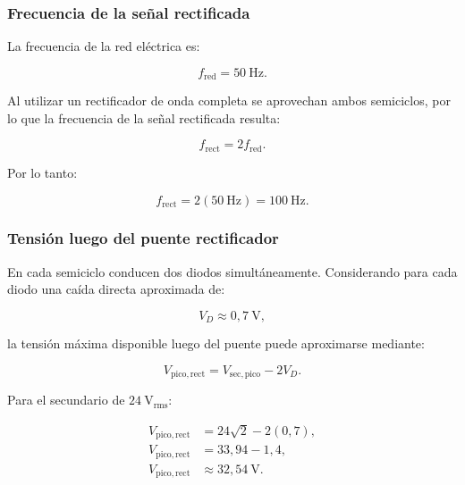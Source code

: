 \documentclass[12pt,a4paper]{article}
\begin{document}
	\subsubsection{Frecuencia de la señal rectificada}
	
	La frecuencia de la red eléctrica es:
	
	\begin{equation}
		f_{\mathrm{red}}
		=
		50~\text{Hz}.
	\end{equation}
	
	Al utilizar un rectificador de onda completa se aprovechan ambos semiciclos,
	por lo que la frecuencia de la señal rectificada resulta:
	
	\begin{equation}
		f_{\mathrm{rect}}
		=
		2f_{\mathrm{red}}.
	\end{equation}
	
	Por lo tanto:
	
	\begin{equation}
		f_{\mathrm{rect}}
		=
		2(50~\text{Hz})
		=
		100~\text{Hz}.
	\end{equation}
	
	\subsubsection{Tensión luego del puente rectificador}
	
	En cada semiciclo conducen dos diodos simultáneamente. Considerando para cada
	diodo una caída directa aproximada de:
	
	\begin{equation}
		V_D\approx0,7~\text{V},
	\end{equation}
	
	la tensión máxima disponible luego del puente puede aproximarse mediante:
	
	\begin{equation}
		V_{\mathrm{pico,rect}}
		=
		V_{\mathrm{sec,pico}}
		-
		2V_D.
	\end{equation}
	
	Para el secundario de $24~\text{V}_{\mathrm{rms}}$:
	
	\begin{align}
		V_{\mathrm{pico,rect}}
		&=
		24\sqrt{2}
		-
		2(0,7),
		\\
		V_{\mathrm{pico,rect}}
		&=
		33,94
		-
		1,4,
		\\
		V_{\mathrm{pico,rect}}
		&\approx
		32,54~\text{V}.
	\end{align}
	
\end{document}
